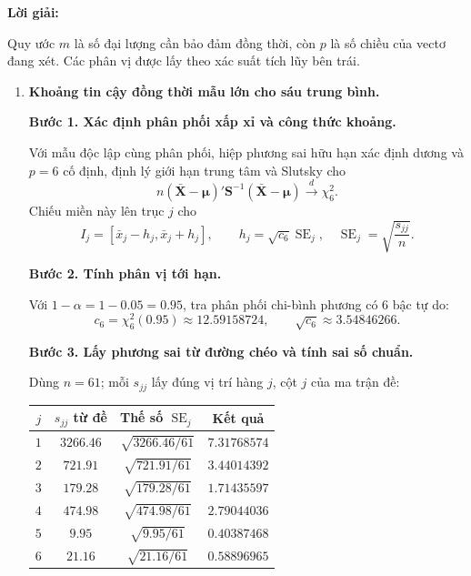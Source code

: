 \documentclass[11pt,a4paper]{article}
\renewcommand{\boldsymbol}[1]{\symbf{#1}}
\newenvironment{solution}{%
  \par\medskip\noindent\textbf{Lời giải:}\par\nobreak\smallskip\noindent\ignorespaces
}{\par}
\newcommand{\step}[2]{\par\medskip\noindent\textbf{Bước #1. #2}\par\nopagebreak[4]\smallskip\noindent}
\begin{document}
\begin{solution}
Quy ước $m$ là số đại lượng cần bảo đảm đồng thời, còn $p$ là số chiều
của vectơ đang xét. Các phân vị được lấy theo xác suất tích lũy bên trái.
\begin{enumerate}[label=\textbf{\alph*)}]
\item \textbf{Khoảng tin cậy đồng thời mẫu lớn cho sáu trung bình.}\par\nopagebreak[4]
\step{1}{Xác định phân phối xấp xỉ và công thức khoảng.}
Với mẫu độc lập cùng phân phối, hiệp phương sai hữu hạn xác định dương
và $p=6$ cố định, định lý giới hạn trung tâm và Slutsky cho
\[
n(\bar{\mathbf{X}}-\boldsymbol{\mu})'\mathbf{S}^{-1}
(\bar{\mathbf{X}}-\boldsymbol{\mu})\xrightarrow{d}\chi_6^2.
\]
Chiếu miền này lên trục $j$ cho
\[
I_j=[\bar{x}_j-h_j,\bar{x}_j+h_j],\qquad
h_j=\sqrt{c_6}\operatorname{SE}_j,\quad
\operatorname{SE}_j=\sqrt{\frac{s_{jj}}n}.
\]
\step{2}{Tính phân vị tới hạn.}
Với $1-\alpha=1-0.05=0.95$, tra phân phối chi-bình phương có 6 bậc tự do:
\[
c_6=\chi_6^2(0.95)\approx12.59158724,\qquad
\sqrt{c_6}\approx3.54846266.
\]
\step{3}{Lấy phương sai từ đường chéo và tính sai số chuẩn.}
Dùng $n=61$; mỗi $s_{jj}$ lấy đúng vị trí hàng $j$, cột $j$ của ma trận đề:
\begin{center}
\small
\begin{tabular}{cccc}
\toprule
$j$ & $s_{jj}$ từ đề & Thế số $\operatorname{SE}_j$ & Kết quả\\
\midrule
$1$ & $3266.46$ & $\sqrt{3266.46/61}$ & $7.31768574$\\
$2$ & $721.91$ & $\sqrt{721.91/61}$ & $3.44014392$\\
$3$ & $179.28$ & $\sqrt{179.28/61}$ & $1.71435597$\\
$4$ & $474.98$ & $\sqrt{474.98/61}$ & $2.79044036$\\
$5$ & $9.95$ & $\sqrt{9.95/61}$ & $0.40387468$\\
$6$ & $21.16$ & $\sqrt{21.16/61}$ & $0.58896965$\\
\bottomrule
\end{tabular}
\end{center}


\end{enumerate}
\end{solution}
\end{document}

